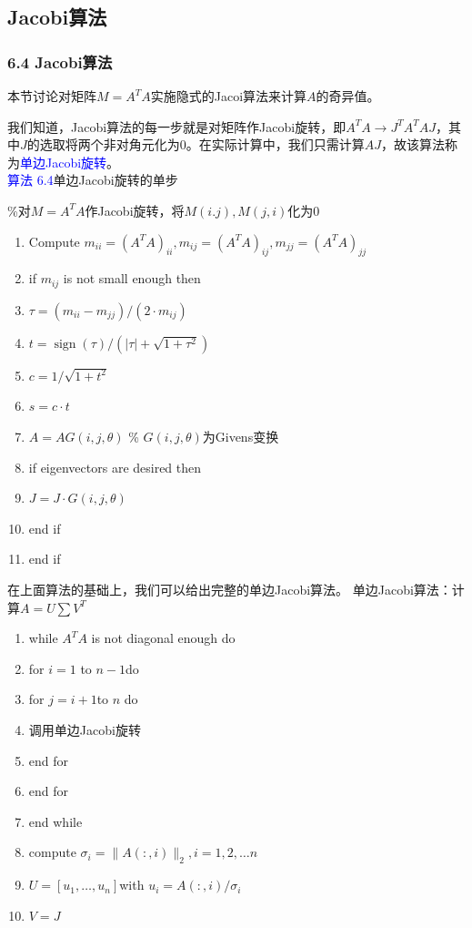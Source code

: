 \documentclass[notheorems,serif]{beamer}
\begin{document}
\subsection*{Jacobi算法}
\begin{frame}
\frametitle{6.4 \qquad Jacobi算法}


本节讨论对矩阵$M=A^TA$实施隐式的Jacoi算法来计算$A$的奇异值。

我们知道，Jacobi算法的每一步就是对矩阵作Jacobi旋转，即$A^TA\rightarrow J^TA^TAJ$，其中$J$的选取将两个非对角元化为0。在实际计算中，我们只需计算$AJ$，故该算法称为\textcolor{blue}{单边Jacobi旋转}。\\
\textcolor{blue}{算法 6.4}\quad 单边Jacobi旋转的单步

\%对$M=A^TA$作Jacobi旋转，将$M(i.j),M(j,i)$化为0
\end{frame}
\begin{frame}

\begin{enumerate}[1:]
	\item Compute $m_{ii}=(A^TA)_{ii},m_{ij}=(A^TA)_{ij},m_{jj}=(A^TA)_{jj}$
	\item if $m_{ij}$ is not small enough then 
	\item \quad $\tau=\left(m_{i i}-m_{j j}\right) / \left(2 \cdot m_{i j}\right)$
	\item \quad $t=\operatorname{sign}(\tau) /\left(|\tau|+\sqrt{1+\tau^{2}}\right)$
	\item \quad $c=1 / \sqrt{1+t^{2}}$
	\item \quad $s=c\cdot t$
	\item \quad $A=A G(i, j, \theta)$ \qquad \% $G(i,j,\theta)$为Givens变换
	\item \quad if eigenvectors are desired then
	\item \qquad $J=J\cdot G(i, j, \theta)$
	\item \quad end if
	\item end if
\end{enumerate}
\end{frame}
\begin{frame}
在上面算法的基础上，我们可以给出完整的单边Jacobi算法。
\quad 单边Jacobi算法：计算$A=U\sum V^T$
\begin{enumerate}[1:]
	\item while $A^TA$ is not diagonal enough do
	\item \quad for $i=1$ to $n-1$do
	\item \qquad for $j=i+1$to $n$ do
	\item \qquad \quad 调用单边Jacobi旋转
	\item \qquad end for 
	\item \quad end for 
	\item end while 
	\item compute $\sigma_{i}=\|A( :, i)\|_{2}, i=1,2, \ldots n$
	\item $U=\left[u_{1}, \dots, u_{n}\right]$with $u_{i}=A( :, i) / \sigma_{i}$
	\item $V=J$
\end{enumerate}
\end{frame}
\end{document}
